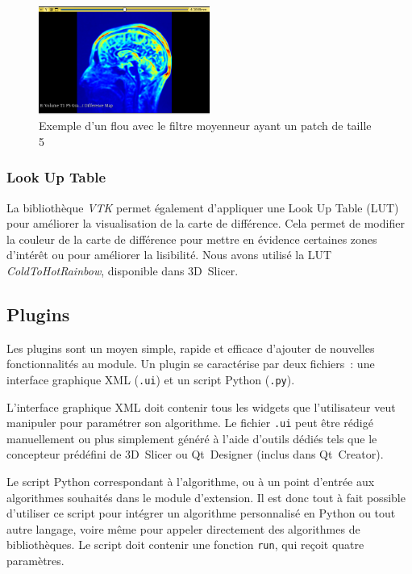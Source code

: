 \documentclass{article}
\begin{document}
{{        \begin{figure}[!ht]
            \centering
            \includegraphics[width=0.5\textwidth]{images/convolve.png}
            \caption{Exemple d'un flou avec le filtre moyenneur ayant un patch de taille 5}
            \label{fig:convolve}
        \end{figure}

        \subsubsection{Look Up Table}
        \label{subsubsec:lut-difference-map-computation-implementation}

        La bibliothèque \textit{VTK} permet également d'appliquer une Look Up Table (LUT) pour améliorer la visualisation de la carte de différence. Cela permet de modifier la couleur de la carte de différence pour mettre en évidence certaines zones d'intérêt ou pour améliorer la lisibilité. Nous avons utilisé la LUT \textit{ColdToHotRainbow}, disponible dans 3D~Slicer.
    }

    {
        \subsection{Plugins}
        \label{subsec:plugins}

        Les plugins sont un moyen simple, rapide et efficace d'ajouter de nouvelles fonctionnalités au module. Un plugin se caractérise par deux fichiers~: une interface graphique XML (\texttt{.ui}) et un script Python (\texttt{.py}).

        \bigskip

        L'interface graphique XML doit contenir tous les widgets que l'utilisateur veut manipuler pour paramétrer son algorithme. Le fichier \texttt{.ui} peut être rédigé manuellement ou plus simplement généré à l'aide d'outils dédiés tels que le concepteur prédéfini de 3D~Slicer ou Qt~Designer (inclus dans Qt~Creator).

        \bigskip

        Le script Python correspondant à l'algorithme, ou à un point d'entrée aux algorithmes souhaités dans le module d'extension. Il est donc tout à fait possible d'utiliser ce script pour intégrer un algorithme personnalisé en Python ou tout autre langage, voire même pour appeler directement des algorithmes de bibliothèques. Le script doit contenir une fonction \texttt{run}, qui reçoit quatre paramètres.

}}
\end{document}
